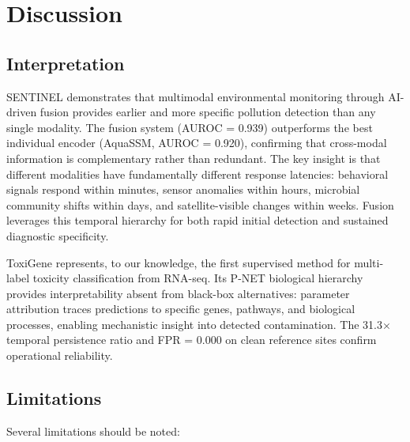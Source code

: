 \section{Discussion}
\label{sec:discussion}

\subsection{Interpretation}

SENTINEL demonstrates that multimodal environmental monitoring through
AI-driven fusion provides earlier and more specific pollution detection
than any single modality. The fusion system (AUROC = 0.939) outperforms
the best individual encoder (AquaSSM, AUROC = 0.920), confirming that
cross-modal information is complementary rather than redundant. The key
insight is that different modalities have fundamentally different response
latencies: behavioral signals respond within minutes, sensor anomalies
within hours, microbial community shifts within days, and satellite-visible
changes within weeks. Fusion leverages this temporal hierarchy for both
rapid initial detection and sustained diagnostic specificity.

ToxiGene represents, to our knowledge, the first supervised method for
multi-label toxicity classification from RNA-seq. Its P-NET biological
hierarchy provides interpretability absent from black-box alternatives:
parameter attribution traces predictions to specific genes, pathways, and
biological processes, enabling mechanistic insight into detected
contamination. The 31.3$\times$ temporal persistence ratio and FPR = 0.000
on clean reference sites confirm operational reliability.

\subsection{Limitations}

Several limitations should be noted:

